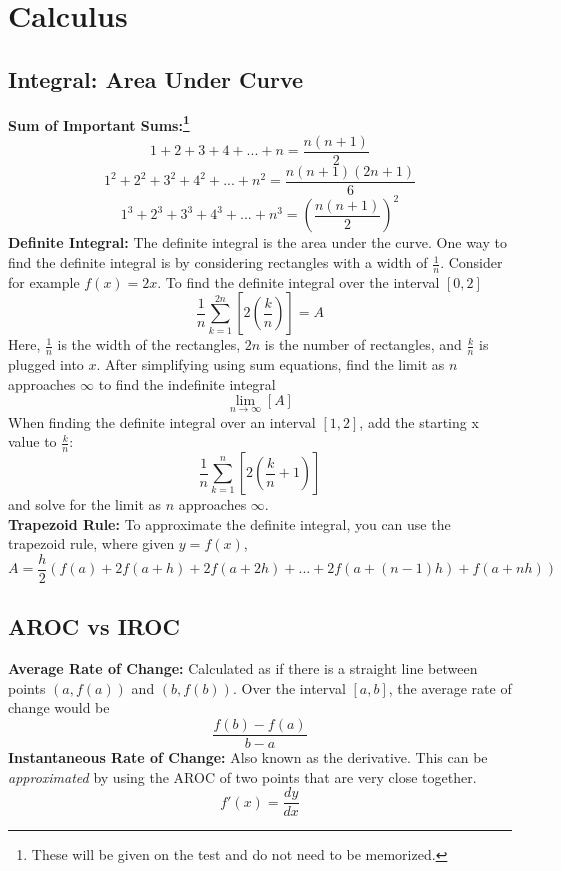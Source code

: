 \documentclass[12pt, letterpaper]{article}
\begin{document}
\section{Calculus}
\subsection{Integral: Area Under Curve}
\textbf{Sum of Important Sums:\footnote{These will be given on the test and do not need to be memorized.}} \[1+2+3+4+...+n = \frac{n(n+1)}{2}\] \[1^2+2^2+3^2+4^2+...+n^2=\frac{n(n+1)(2n+1)}{6}\] \[1^3+2^3+3^3+4^3+...+n^3=(\frac{n(n+1)}{2})^2\]
\textbf{Definite Integral:} The definite integral is the area under the curve. One way to find the definite integral is by considering rectangles with a width of $\frac{1}{n}$. Consider for example $f(x)=2x$. To find the definite integral over the interval $[0,2]$ \[\frac{1}{n}\sum_{k=1}^{2n}[2(\frac{k}{n})]=A\] Here, $\frac{1}{n}$ is the width of the rectangles, $2n$ is the number of rectangles, and $\frac{k}{n}$ is plugged into $x$. After simplifying using sum equations, find the limit as $n$ approaches $\infty$ to find the indefinite integral \[\lim_{n\rightarrow\infty}[A]\] When finding the definite integral over an interval $[1,2]$, add the starting x value to $\frac{k}{n}$: \[\frac{1}{n}\sum_{k=1}^{n}[2(\frac{k}{n}+1)]\] and solve for the limit as $n$ approaches $\infty$. \vspace{1em}\\
\textbf{Trapezoid Rule:} To approximate the definite integral, you can use the trapezoid rule, where given $y=f(x)$, \[A=\frac{h}{2}(f(a)+2f(a+h)+2f(a+2h)+...+2f(a+(n-1)h)+f(a+nh))\]

\subsection{AROC vs IROC}
\textbf{Average Rate of Change:} Calculated as if there is a straight line between points $(a,f(a))$ and $(b, f(b))$. Over the interval $[a,b]$, the average rate of change would be \[\frac{f(b)-f(a)}{b-a}\]
\textbf{Instantaneous Rate of Change:} Also known as the derivative. This can be \textit{approximated} by using the AROC of two points that are very close together. \[f'(x)=\frac{dy}{dx}\]
\end{document}
